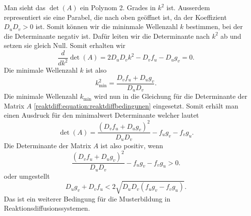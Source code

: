 Man sieht das \(\det(A)\) ein Polynom 2. Grades in \(k^2\) ist.
Ausserdem representiert sie eine Parabel, die nach oben geöffnet ist, da der Koeffizient \(D_uD_v > 0\) ist.
Somit können wir die mininmale Wellenzahl \(k\) bestimmen, bei der die Determinante negativ ist.
Dafür leiten wir die Determinante nach \(k^2\) ab und setzen sie gleich Null.
Somit erhalten wir
\begin{equation*}
    \frac{d}{dk^2} \det(A) = 2D_uD_vk^2 - D_v f_u - D_u g_v = 0.
\end{equation*}
Die minimale Wellenzahl \(k\) ist also
\begin{equation*}
    k^2_{\text{min}} = \frac{D_vf_u + D_ug_v}{D_uD_v}.
\end{equation*}
Die minimale Wellenzahl \(k_{\text{min}}\) wird nun in die Gleichung für die Determinante der Matrix \(A\) \ref{reaktdiff:equation:reaktdiffbedingunen} eingesetzt.
Somit erhält man einen Ausdruck für den minimalwert Determinante welcher lautet
\begin{equation*}
    \det(A) = \frac{(D_vf_u + D_ug_v)^2}{D_uD_v} - f_u g_v - f_v g_u.
\end{equation*}
Die Determinante der Matrix \(A\) ist also positiv, wenn
\begin{equation*}
    \frac{(D_vf_u + D_ug_v)^2}{D_uD_v} - f_u g_v - f_v g_u > 0.
\end{equation*}
oder umgestellt
\begin{equation*}
    D_ug_v+D_vf_u < 2\sqrt{D_uD_v(f_u g_v - f_v g_u)}.
\end{equation*}
Das ist ein weiterer Bedingung für die Musterbildung in Reaktionsdiffusionssystemen.







